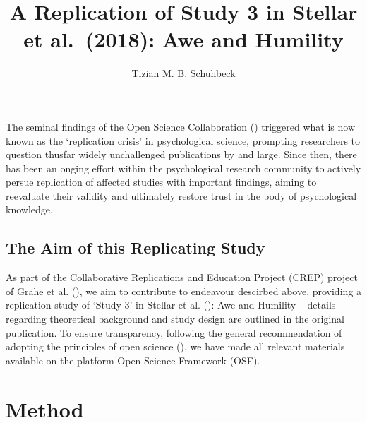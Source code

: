 \documentclass[
  stu,
  longtable,
  nolmodern,
  notxfonts,
  notimes,
  colorlinks=true,linkcolor=blue,citecolor=blue,urlcolor=blue]{apa7}
\title{A Replication of Study 3 in Stellar et al.~(2018): Awe and
Humility}
\author{Tizian M. B. Schuhbeck}
\affiliation{
{Department of Psychology, Ludwig-Maximilians-Universität München}}
\newlength{\cslhangindent}
\newlength{\csllabelwidth}
\begin{document}
\maketitle




\setlength\LTleft{0pt}



\ifdefined\Shaded\renewenvironment{Shaded}{\begin{snugshade}\begin{singlespace}}{\end{singlespace}\end{snugshade}}\fi


\ifdefined\cslhangindent\else\newlength{\cslhangindent}\fi
\ifdefined\csllabelwidth\else\newlength{\csllabelwidth}\fi
\setlength{\cslhangindent}{0.5in}


The seminal findings of the Open Science Collaboration
() triggered what is now known as
the `replication crisis' in psychological science, prompting researchers
to question thusfar widely unchallenged publications by and large. Since
then, there has been an onging effort within the psychological research
community to actively persue replication of affected studies with
important findings, aiming to reevaluate their validity and ultimately
restore trust in the body of psychological knowledge.

\subsection{The Aim of this Replicating
Study}\label{the-aim-of-this-replicating-study}

As part of the Collaborative Replications and Education Project (CREP)
project of Grahe et al. (), we aim to
contribute to endeavour descirbed above, providing a replication study
of `Study 3' in Stellar et al. ():
Awe and Humility -- details regarding theoretical background and study
design are outlined in the original publication. To ensure transparency,
following the general recommendation of adopting the principles of open
science (), we have made all relevant materials available on the
platform Open Science Framework (OSF).

\section{Method}\label{method}
\end{document}

